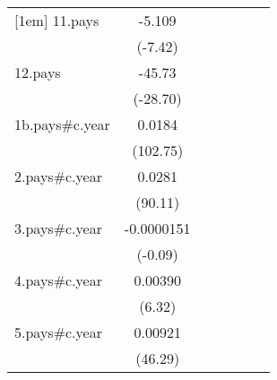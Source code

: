 {\begin{tabular}{l*{6}{c}}
[1em]
11.pays             &      -5.109\sym{***}&                     &                     &                     &                     &                     \\
                    &     (-7.42)         &                     &                     &                     &                     &                     \\
[1em]
12.pays             &      -45.73\sym{***}&                     &                     &                     &                     &                     \\
                    &    (-28.70)         &                     &                     &                     &                     &                     \\
[1em]
1b.pays#c.year      &      0.0184\sym{***}&                     &                     &                     &                     &                     \\
                    &    (102.75)         &                     &                     &                     &                     &                     \\
[1em]
2.pays#c.year       &      0.0281\sym{***}&                     &                     &                     &                     &                     \\
                    &     (90.11)         &                     &                     &                     &                     &                     \\
[1em]
3.pays#c.year       &  -0.0000151         &                     &                     &                     &                     &                     \\
                    &     (-0.09)         &                     &                     &                     &                     &                     \\
[1em]
4.pays#c.year       &     0.00390\sym{***}&                     &                     &                     &                     &                     \\
                    &      (6.32)         &                     &                     &                     &                     &                     \\
[1em]
5.pays#c.year       &     0.00921\sym{***}&                     &                     &                     &                     &                     \\
                    &     (46.29)         &                     &                     &                     &                     &                     \\

\end{tabular}}
